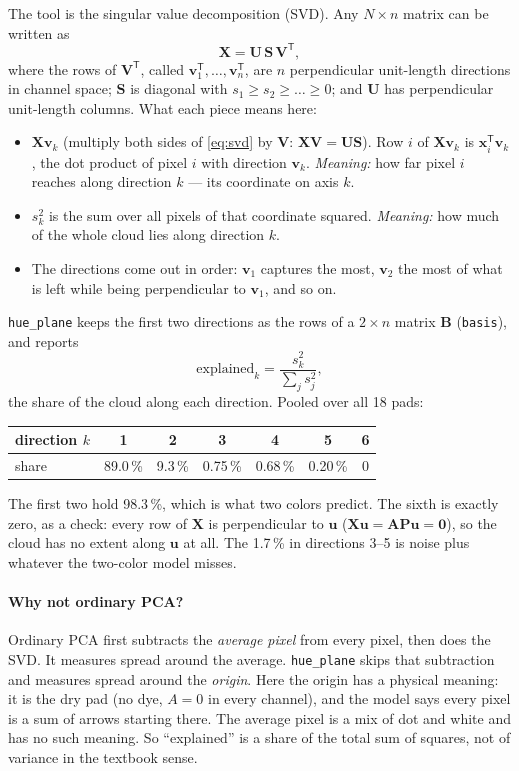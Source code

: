 \documentclass[11pt,letterpaper]{article}
\newcommand{\code}[1]{\texttt{#1}}
\newcommand{\vx}{\mathbf{x}}
\newcommand{\vv}{\mathbf{v}}
\newcommand{\vu}{\mathbf{u}}
\newcommand{\mA}{\mathbf{A}}
\newcommand{\mX}{\mathbf{X}}
\newcommand{\mP}{\mathbf{P}}
\newcommand{\mB}{\mathbf{B}}
\newcommand{\mU}{\mathbf{U}}
\newcommand{\mS}{\mathbf{S}}
\newcommand{\mV}{\mathbf{V}}
\newcommand{\T}{^{\mathsf{T}}}
\begin{document}
The tool is the singular value decomposition (SVD).  Any $N\times n$ matrix
can be written as
\begin{equation}
\mX = \mU\,\mS\,\mV\T,
\label{eq:svd}
\end{equation}
where the rows of $\mV\T$, called $\vv_1\T,\dots,\vv_n\T$, are $n$
perpendicular unit-length directions in channel space; $\mS$ is diagonal
with $s_1 \ge s_2 \ge \dots \ge 0$; and $\mU$ has perpendicular unit-length
columns.  What each piece means here:
\begin{itemize}
\item \textbf{$\mX\vv_k$} (multiply both sides of \eqref{eq:svd} by
  $\mV$: $\mX\mV = \mU\mS$).  Row $i$ of $\mX\vv_k$ is $\vx_i\T\vv_k$, the
  dot product of pixel $i$ with direction $\vv_k$.  \emph{Meaning:} how far
  pixel $i$ reaches along direction $k$ --- its coordinate on axis $k$.
\item \textbf{$s_k^2$} is the sum over all pixels of that coordinate squared.
  \emph{Meaning:} how much of the whole cloud lies along direction $k$.
\item The directions come out in order: $\vv_1$ captures the most, $\vv_2$
  the most of what is left while being perpendicular to $\vv_1$, and so on.
\end{itemize}
\code{hue\_plane} keeps the first two directions as the rows of a
$2\times n$ matrix $\mB$ (\code{basis}), and reports
\[
\text{explained}_k = \frac{s_k^2}{\sum_j s_j^2},
\]
the share of the cloud along each direction.  Pooled over all 18 pads:
\begin{center}\small
\begin{tabular}{@{}lcccccc@{}}
\toprule
direction $k$ & 1 & 2 & 3 & 4 & 5 & 6 \\
\midrule
share & 89.0\,\% & 9.3\,\% & 0.75\,\% & 0.68\,\% & 0.20\,\% & 0 \\
\bottomrule
\end{tabular}
\end{center}
The first two hold 98.3\,\%, which is what two colors predict.  The sixth
is exactly zero, as a check: every row of $\mX$ is perpendicular to $\vu$
($\mX\vu = \mA\mP\vu = \mathbf 0$), so the cloud has no extent along $\vu$ at
all.  The 1.7\,\% in directions 3--5 is noise plus whatever the two-color
model misses.

\paragraph{Why not ordinary PCA?}  Ordinary PCA first subtracts the
\emph{average pixel} from every pixel, then does the SVD.  It measures spread
around the average.  \code{hue\_plane} skips that subtraction and measures
spread around the \emph{origin}.  Here the origin has a physical meaning: it
is the dry pad (no dye, $A = 0$ in every channel), and the model says every
pixel is a sum of arrows starting there.  The average pixel is a mix of dot
and white and has no such meaning.  So ``explained'' is a share of the total
sum of squares, not of variance in the textbook sense.
\end{document}

